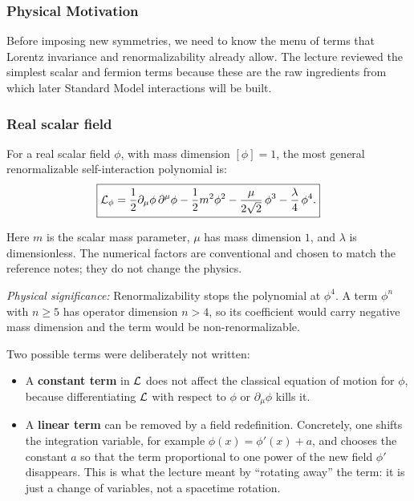 \documentclass[../main.tex]{subfiles}
\begin{document}
\subsubsection*{Physical Motivation}

Before imposing new symmetries, we need to know the menu of terms that Lorentz invariance and renormalizability already allow.  The lecture reviewed the simplest scalar and fermion terms because these are the raw ingredients from which later Standard Model interactions will be built.

\subsubsection*{Real scalar field}

For a real scalar field $\phi$, with mass dimension $[\phi]=1$, the most general renormalizable self-interaction polynomial is:
\begin{equation}
  \boxed{
  \mathcal{L}_{\phi}
  =
  \frac{1}{2}\partial_\mu\phi\,\partial^\mu\phi
  -\frac{1}{2}m^2\phi^2
  -\frac{\mu}{2\sqrt{2}}\,\phi^3
  -\frac{\lambda}{4}\,\phi^4.}
  \label{eq:lec09:real-scalar-lagrangian}
\end{equation}

Here $m$ is the scalar mass parameter, $\mu$ has mass dimension $1$, and $\lambda$ is dimensionless.  The numerical factors are conventional and chosen to match the reference notes; they do not change the physics.

\textit{Physical significance:} Renormalizability stops the polynomial at $\phi^4$.  A term $\phi^n$ with $n\geq5$ has operator dimension $n>4$, so its coefficient would carry negative mass dimension and the term would be non-renormalizable.

Two possible terms were deliberately not written:
\begin{itemize}
  \item A \textbf{constant term} in $\mathcal{L}$ does not affect the classical equation of motion for $\phi$, because differentiating $\mathcal{L}$ with respect to $\phi$ or $\partial_\mu\phi$ kills it.
  \item A \textbf{linear term} can be removed by a field redefinition.  Concretely, one shifts the integration variable, for example $\phi(x)=\phi'(x)+a$, and chooses the constant $a$ so that the term proportional to one power of the new field $\phi'$ disappears.  This is what the lecture meant by ``rotating away'' the term: it is just a change of variables, not a spacetime rotation.
\end{itemize}
\end{document}
